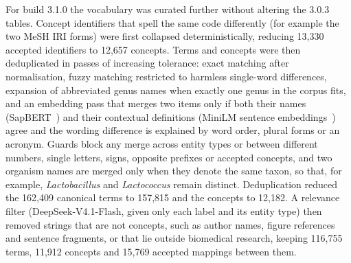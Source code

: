 \documentclass[referee,lineno,pdflatex,sn-vancouver-num]{sn-jnl}
\theoremstyle{thmstyleone}%
\theoremstyle{thmstyletwo}%
\theoremstyle{thmstylethree}%
\begin{document}
For build 3.1.0 the vocabulary was curated further without altering the
3.0.3 tables. Concept identifiers that spell the same code differently
(for example the two MeSH IRI forms) were first collapsed
deterministically, reducing 13,330 accepted identifiers to 12,657 concepts.
Terms and concepts were then deduplicated in passes of increasing
tolerance: exact matching after normalisation, fuzzy matching restricted
to harmless single-word differences, expansion of abbreviated genus names
when exactly one genus in the corpus fits, and an embedding pass that
merges two items only if both their names (SapBERT~\cite{liu2021sapbert}) and their contextual
definitions (MiniLM sentence embeddings~\cite{liu2019sbert,minilmcard}) agree and the wording difference is explained by word
order, plural forms or an acronym. Guards block any merge across entity
types or between different numbers, single letters, signs, opposite
prefixes or accepted concepts, and two organism names are merged only when
they denote the same taxon, so that, for example, \textit{Lactobacillus}
and \textit{Lactococcus} remain distinct. Deduplication reduced the
162,409 canonical terms to 157,815 and the concepts to 12,182. A relevance
filter (DeepSeek-V4.1-Flash, given only each label and its entity type)
then removed strings that are not concepts, such as author names, figure
references and sentence fragments, or that lie outside biomedical
research, keeping 116,755 terms, 11,912 concepts and 15,769 accepted
mappings between them.
\end{document}
